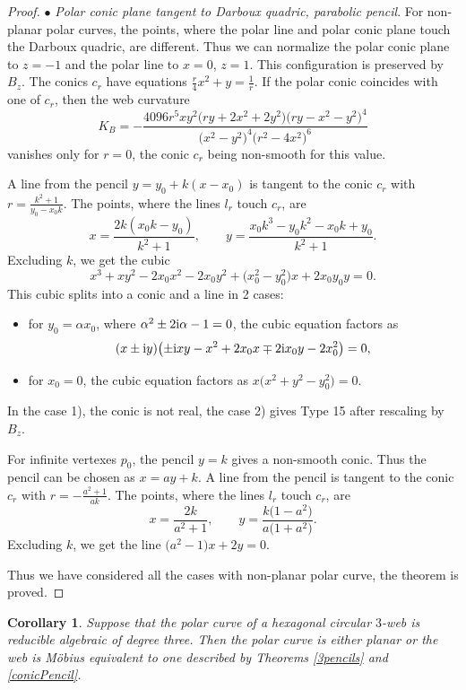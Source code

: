 \documentclass[pdftex]{sigma}
\numberwithin{equation}{section}
\newtheorem{Corollary}[Theorem]{Corollary}
\begin{document}
\begin{proof}
$\bullet$ {\it Polar conic plane tangent to Darboux quadric, parabolic pencil}.
For non-planar polar curves, the points, where the polar line and polar conic plane touch the Darboux quadric, are different. Thus we can normalize the polar conic plane to $z=-1$ and the polar line to $x=0$, $z=1$. This configuration is preserved by $B_z$. The conics $c_r$ have equations
$
\frac{r}{4}x^2 + y =\frac{1}{r}$.
If the polar conic coincides with one of $c_r$, then the web curvature
\[
K_B=-\frac{4096r^5xy^2\bigl(ry + 2x^2 + 2y^2\bigr)\bigl(ry - x^2 - y^2\bigr)^4}{\bigl(x^2 - y^2\bigr)^4\bigl(r^2 - 4x^2\bigr)^6}
\]
vanishes only for $r=0$, the conic $c_r$ being non-smooth for this value.

 A line from the pencil $y=y_0+k(x-x_0)$ is tangent to the conic $c_r$ with
$
r=\frac{k^2+1}{y_0-x_0k}$.
 The points, where the lines $l_r$ touch $c_r$, are
\[
x=\frac{2k(x_0k - y_0)}{k^2 + 1},\qquad
y=\frac{x_0k^3 -y_0 k^2 -x_0 k + y_0}{k^2 + 1}.
\]
Excluding $k$, we get the cubic
\[
x^3+ xy^2 - 2x_0x^2- 2x_0y^2 + \bigl(x_0^2 - y_0^2\bigr)x + 2x_0y_0y=0.
\]
This cubic splits into a conic and a line in 2
 cases:
 \begin{itemize}
\item[(1)] for $y_0=\alpha x_0$, where $\alpha ^2 \pm 2{\rm i} \alpha -1=0$, the cubic equation factors as
\[
(x \pm {\rm i} y)\bigl(\pm {\rm i} xy -x^2 +2x_0x\mp 2{\rm i} x_0y - 2x_0^2\bigr)=0,
\]
\item[(2)] for $x_0=0$, the cubic equation factors as $x\bigl(x^2+y^2-y_0^2\bigr)=0$.
 \end{itemize}
 In the case 1), the conic is not real, the case 2) gives Type 15 after rescaling by $B_z$.

 For infinite vertexes $p_0$, the pencil $y=k$ gives a non-smooth conic. Thus the pencil can be chosen as $x=ay+k$. A line from the pencil is tangent to the conic $c_r$ with
$
r=-\frac{a^2+ 1}{ak}$.
 The points, where the lines $l_r$ touch $c_r$, are
\[
x=\frac{2k}{a^2+1}, \qquad y=\frac{k\bigl(1- a^2 \bigr)}{a\bigl(1+a^2\bigr)}.
\]
Excluding $k$, we get the line
$\bigl(a^2 - 1\bigr)x + 2y=0$.

 Thus we have considered all the cases with non-planar polar curve, the theorem is proved.
\end{proof}

\begin{Corollary}
Suppose that the polar curve of a hexagonal circular $3$-web is reducible algebraic of degree three. Then the polar curve is either planar or the web is M\"obius equivalent to one described by Theorems {\rm\ref{3pencils}} and {\rm\ref{conicPencil}}.
\end{Corollary}
\end{document}
